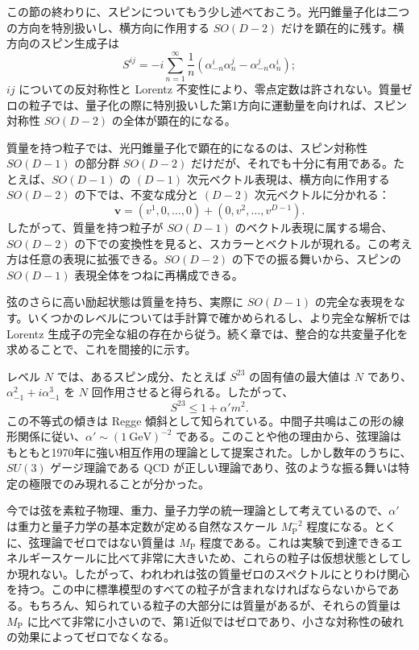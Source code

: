 この節の終わりに、スピンについてもう少し述べておこう。光円錐量子化は二つの方向を特別扱いし、横方向に作用する $SO(D-2)$ だけを顕在的に残す。横方向のスピン生成子は
\begin{equation}
S^{ij}=-i\sum_{n=1}^\infty\frac1n
\left(\alpha_{-n}^i\alpha_n^j-\alpha_{-n}^j\alpha_n^i\right);
\tag{1.3.41}\label{eq:1.3.41}
\end{equation}
$ij$ についての反対称性と Lorentz 不変性により、零点定数は許されない。質量ゼロの粒子では、量子化の際に特別扱いした第1方向に運動量を向ければ、スピン対称性 $SO(D-2)$ の全体が顕在的になる。

質量を持つ粒子では、光円錐量子化で顕在的になるのは、スピン対称性 $SO(D-1)$ の部分群 $SO(D-2)$ だけだが、それでも十分に有用である。たとえば、$SO(D-1)$ の $(D-1)$ 次元ベクトル表現は、横方向に作用する $SO(D-2)$ の下では、不変な成分と $(D-2)$ 次元ベクトルに分かれる：
\begin{equation}
\bm v=(v^1,0,\ldots,0)+(0,v^2,\ldots,v^{D-1}).
\tag{1.3.42}\label{eq:1.3.42}
\end{equation}
したがって、質量を持つ粒子が $SO(D-1)$ のベクトル表現に属する場合、$SO(D-2)$ の下での変換性を見ると、スカラーとベクトルが現れる。この考え方は任意の表現に拡張できる。$SO(D-2)$ の下での振る舞いから、スピンの $SO(D-1)$ 表現全体をつねに再構成できる。

弦のさらに高い励起状態は質量を持ち、実際に $SO(D-1)$ の完全な表現をなす。いくつかのレベルについては手計算で確かめられるし、より完全な解析では Lorentz 生成子の完全な組の存在から従う。続く章では、整合的な共変量子化を求めることで、これを間接的に示す。

レベル $N$ では、あるスピン成分、たとえば $S^{23}$ の固有値の最大値は $N$ であり、$\alpha_{-1}^2+i\alpha_{-1}^3$ を $N$ 回作用させると得られる。したがって、
\begin{equation}
S^{23}\leq1+\alpha'm^2.
\tag{1.3.43}\label{eq:1.3.43}
\end{equation}
この不等式の傾きは Regge 傾斜として知られている。中間子共鳴はこの形の線形関係に従い、$\alpha'\sim(1\ \mathrm{GeV})^{-2}$ である。このことや他の理由から、弦理論はもともと1970年に強い相互作用の理論として提案された。しかし数年のうちに、$SU(3)$ ゲージ理論である QCD が正しい理論であり、弦のような振る舞いは特定の極限でのみ現れることが分かった。

今では弦を素粒子物理、重力、量子力学の統一理論として考えているので、$\alpha'$ は重力と量子力学の基本定数が定める自然なスケール $M_{\mathrm P}^{-2}$ 程度になる。とくに、弦理論でゼロではない質量は $M_{\mathrm P}$ 程度である。これは実験で到達できるエネルギースケールに比べて非常に大きいため、これらの粒子は仮想状態としてしか現れない。したがって、われわれは弦の質量ゼロのスペクトルにとりわけ関心を持つ。この中に標準模型のすべての粒子が含まれなければならないからである。もちろん、知られている粒子の大部分には質量があるが、それらの質量は $M_{\mathrm P}$ に比べて非常に小さいので、第1近似ではゼロであり、小さな対称性の破れの効果によってゼロでなくなる。


